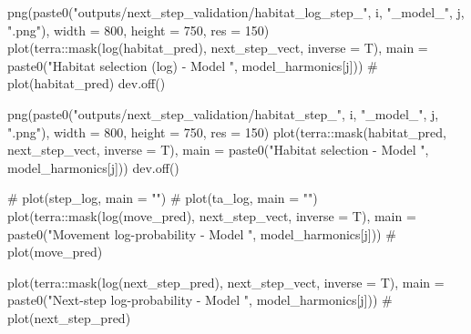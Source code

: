 \documentclass[
  letterpaper,
  DIV=11,
  numbers=noendperiod]{scrartcl}
\newenvironment{Shaded}{\begin{snugshade}}{\end{snugshade}}
\newcommand{\AttributeTok}[1]{\textcolor[rgb]{0.40,0.45,0.13}{#1}}
\newcommand{\CommentTok}[1]{\textcolor[rgb]{0.37,0.37,0.37}{#1}}
\newcommand{\DecValTok}[1]{\textcolor[rgb]{0.68,0.00,0.00}{#1}}
\newcommand{\FunctionTok}[1]{\textcolor[rgb]{0.28,0.35,0.67}{#1}}
\newcommand{\NormalTok}[1]{\textcolor[rgb]{0.00,0.23,0.31}{#1}}
\newcommand{\SpecialCharTok}[1]{\textcolor[rgb]{0.37,0.37,0.37}{#1}}
\newcommand{\StringTok}[1]{\textcolor[rgb]{0.13,0.47,0.30}{#1}}
\begin{document}
\begin{Shaded}
\begin{Highlighting}[]
        
        \FunctionTok{png}\NormalTok{(}\FunctionTok{paste0}\NormalTok{(}\StringTok{"outputs/next\_step\_validation/habitat\_log\_step\_"}\NormalTok{, i, }\StringTok{"\_model\_"}\NormalTok{, j, }\StringTok{".png"}\NormalTok{),}
        \AttributeTok{width =} \DecValTok{800}\NormalTok{, }\AttributeTok{height =} \DecValTok{750}\NormalTok{, }\AttributeTok{res =} \DecValTok{150}\NormalTok{)}
        \FunctionTok{plot}\NormalTok{(terra}\SpecialCharTok{::}\FunctionTok{mask}\NormalTok{(}\FunctionTok{log}\NormalTok{(habitat\_pred), next\_step\_vect, }\AttributeTok{inverse =}\NormalTok{ T), }
             \AttributeTok{main =} \FunctionTok{paste0}\NormalTok{(}\StringTok{"Habitat selection (log) {-} Model "}\NormalTok{, model\_harmonics[j]))}
        \CommentTok{\# plot(habitat\_pred)}
        \FunctionTok{dev.off}\NormalTok{()}
        
        \FunctionTok{png}\NormalTok{(}\FunctionTok{paste0}\NormalTok{(}\StringTok{"outputs/next\_step\_validation/habitat\_step\_"}\NormalTok{, i, }\StringTok{"\_model\_"}\NormalTok{, j, }\StringTok{".png"}\NormalTok{),}
        \AttributeTok{width =} \DecValTok{800}\NormalTok{, }\AttributeTok{height =} \DecValTok{750}\NormalTok{, }\AttributeTok{res =} \DecValTok{150}\NormalTok{)}
        \FunctionTok{plot}\NormalTok{(terra}\SpecialCharTok{::}\FunctionTok{mask}\NormalTok{(habitat\_pred, next\_step\_vect, }\AttributeTok{inverse =}\NormalTok{ T), }
             \AttributeTok{main =} \FunctionTok{paste0}\NormalTok{(}\StringTok{"Habitat selection {-} Model "}\NormalTok{, model\_harmonics[j]))}
        \FunctionTok{dev.off}\NormalTok{()}
        
        \CommentTok{\# plot(step\_log, main = "")}
        \CommentTok{\# plot(ta\_log, main = "")}
        \FunctionTok{plot}\NormalTok{(terra}\SpecialCharTok{::}\FunctionTok{mask}\NormalTok{(}\FunctionTok{log}\NormalTok{(move\_pred), next\_step\_vect, }\AttributeTok{inverse =}\NormalTok{ T), }
             \AttributeTok{main =} \FunctionTok{paste0}\NormalTok{(}\StringTok{"Movement log{-}probability {-} Model "}\NormalTok{, model\_harmonics[j]))}
        \CommentTok{\# plot(move\_pred)}
        
        \FunctionTok{plot}\NormalTok{(terra}\SpecialCharTok{::}\FunctionTok{mask}\NormalTok{(}\FunctionTok{log}\NormalTok{(next\_step\_pred), next\_step\_vect, }\AttributeTok{inverse =}\NormalTok{ T), }
             \AttributeTok{main =} \FunctionTok{paste0}\NormalTok{(}\StringTok{"Next{-}step log{-}probability {-} Model "}\NormalTok{, model\_harmonics[j]))}
        \CommentTok{\# plot(next\_step\_pred)}
        

\end{Highlighting}
\end{Shaded}
\end{document}
